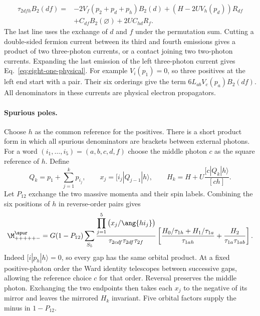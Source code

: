 \begin{equation}\label{eq:eight-one-mixed-end}
\begin{aligned}
 \tau_{2dfh}B_2(df)={}&
 -2V_f(p_2+p_d+p_h)B_2(d)+(H-2U V_h(p_d))R_{df}\\
 &+ C_{df}B_2(\varnothing)+2U C_{hd}R_f .
\end{aligned}
\end{equation}
The last line uses the exchange of $d$ and $f$ under the permutation
sum. Cutting a double-sided fermion current between its third and fourth
emissions gives a product of two three-photon currents, or a contact
joining two two-photon currents. Expanding the last emission of the left
three-photon current gives Eq.~\eqref{eq:eight-one-physical}.
For example $V_i(p_1)=0$, so three positives at the left end start with
a pair. Their six orderings give the term $6L_{ab}V_c(p_a)B_2(df)$.
All denominators in these currents are physical electron propagators.

\paragraph{Spurious poles.}
Choose $h$ as the common reference for the positives. There is a short
product form in which all spurious denominators are brackets between
external photons. For a word $(i_1,\ldots,i_5)=(a,b,c,d,f)$ choose the
middle photon $c$ as the square reference of $h$. Define
\[
 Q_k=p_1+\sum_{j=1}^k p_{i_j},\qquad
 x_j=[i_j|Q_{j-1}|h\rangle,\qquad
 H_k=H+U\frac{[c|Q_k|h\rangle}{[ch]} .
\]
Let $P_{12}$ exchange the two massive momenta and their spin labels.
Combining the six positions of $h$ in reverse-order pairs gives
\begin{equation}\label{eq:eight-one-gaps}
 \M^{\spur}_{+++++-}=G(1-P_{12})\sum_{S_5}
 \frac{\displaystyle\prod_{j=1}^5 \big(x_j/\ang{h i_j}\big)}
      {\tau_{2cdf}\tau_{2df}\tau_{2f}}
 \left[\frac{H_0/\tau_{1h}+H_1/\tau_{1a}}{\tau_{1ah}}
           +\frac{H_2}{\tau_{1a}\tau_{1ab}}\right].
\end{equation}
Indeed $[i|p_h|h\rangle=0$, so every gap has the same orbital product.
At a fixed positive-photon order the Ward identity telescopes between
successive gaps, allowing the reference choice $c$ for that order.
Reversal preserves the middle photon. Exchanging the two endpoints then
takes each $x_j$ to the negative of its mirror and leaves the mirrored
$H_k$ invariant. Five orbital factors supply the minus in $1-P_{12}$.

